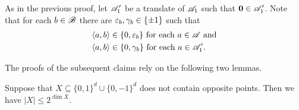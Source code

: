 As in the previous proof, let ${\mathscr{A}}_1'$ be a translate of ${\mathscr{A}}_1$ such that $\mathbf{0} \in {\mathscr{A}}_1'$.
Note that for each $b \in {\mathscr{B}}$ there are ${\varepsilon}_b,\gamma_b \in \{\pm 1\}$ such that
\begin{align}
    \label{eqscaleps}
    & \langle a, b\rangle \in \{0,{\varepsilon}_b\} \text{ for each } a \in {\mathscr{A}} \text{ and} \\
    \label{eqscala1pgamma}
    & \langle a, b\rangle \in \{0,\gamma_b\} \text{ for each } a \in {\mathscr{A}}_1'.
\end{align}

\noindent The proofs of the subsequent claims rely on the following two lemmas.

\begin{lemma}
    \label{lemslice}
    Suppose that $X \subseteq \{0,1\}^d \cup \{0,-1\}^d$ does not contain opposite points.
    Then we have $|X| \le 2^{\dim X}$.
\end{lemma}
